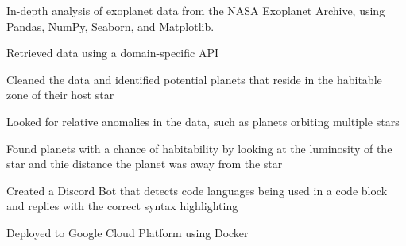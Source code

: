 \documentclass[]{resume-template}
\begin{document}
\begin{minipage}[t]{0.66\textwidth}
	\label{subsec:exo-eda}
	\begin{tightemize}
		\item In-depth analysis of exoplanet data from the NASA Exoplanet Archive, using Pandas, NumPy,
		Seaborn, and Matplotlib.
		\item Retrieved data using a domain-specific API
		\item Cleaned the data and identified potential planets that reside in the habitable zone of their host star
		\item Looked for relative anomalies in the data, such as planets orbiting multiple stars
		\item Found planets with a chance of habitability by looking at the luminosity of the star and thie distance the planet was away from the star

	\end{tightemize}
	\vspace{\topsep}

	\label{subsec:neatbot}
	\begin{tightemize}
		\item Created a Discord Bot that detects code languages being used in a code block and replies with the correct syntax highlighting
		\item Deployed to Google Cloud Platform using Docker
	\end{tightemize}



\end{minipage}
\end{document}
